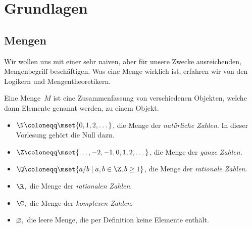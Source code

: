 \documentclass[a4paper]{article}
\begin{document}
\maketitle
\tableofcontents

\section{Grundlagen}

\subsection{Mengen}

Wir wollen uns mit einer sehr naiven, aber für unsere Zwecke ausreichenden, Mengenbegriff beschäftigen. Was eine Menge wirklich ist, erfahren wir von den Logikern und Mengentheoretikern.

\begin{definition}
    Eine Menge~$M$ ist eine Zusammenfassung von verschiedenen Objekten, welche dann Elemente genannt werden, zu einem Objekt.
\end{definition}

\begin{example}\leavevmode
    \begin{itemize}
        \item $\N \coloneqq \mset{0, 1, 2, \dots}$, die Menge der \emph{natürliche Zahlen}. In dieser Vorlesung gehört die Null dazu.
        \item $\Z \coloneqq \mset{\dots, -2, -1, 0, 1, 2, \dots}$, die Menge der \emph{ganze Zahlen}.
        \item $\Q \coloneqq \mset{a/b \mid a, b \in \Z, b \geq 1}$, die Menge der \emph{rationale Zahlen}.
        \item $\R$,~die Menge der \emph{rationalen Zahlen}.
        \item $\C$,~die Menge der \emph{komplexen Zahlen}.
        \item $\varnothing$,~die leere Menge, die per Definition keine Elemente enthält.
    \end{itemize}
\end{example}
\end{document}
